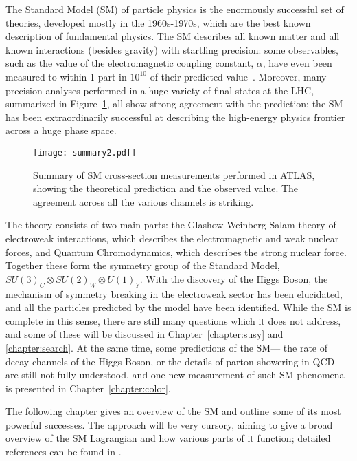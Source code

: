 \label{chapter:sm}

The Standard Model (SM) of particle physics is the enormously successful set of theories, developed mostly in the 1960s-1970s, which are the best known description of fundamental physics. The SM describes all known matter and all known interactions (besides gravity) with startling precision: some observables, such as the value of the electromagnetic coupling constant, $\alpha$, have even been measured to within 1 part in $10^{10}$ of their predicted value~\cite{PhysRevLett.100.120801}. Moreover, many precision analyses performed in a huge variety of final states at the LHC, summarized in Figure~\ref{fig:sm:summary}, all show strong agreement with the prediction: the SM has been extraordinarily successful at describing the high-energy physics frontier across a huge phase space.


\begin{figure}
\centering
\texttt{[image: summary2.pdf]}
\caption{Summary of SM cross-section measurements performed in ATLAS, showing the theoretical prediction and the observed value. The agreement across all the various channels is striking.}
\label{fig:sm:summary}
\end{figure}



The theory consists of two main parts: the Glashow-Weinberg-Salam theory of electroweak interactions, which describes the electromagnetic and weak nuclear forces, and Quantum Chromodynamics, which describes the strong nuclear force. Together these form the symmetry group of the Standard Model, $SU(3)_C \otimes SU(2)_W \otimes U(1)_Y$. With the discovery of the Higgs Boson, the mechanism of symmetry breaking in the electroweak sector has been elucidated, and all the particles predicted by the model have been identified. While the SM is complete in this sense, there are still many questions which it does not address, and some of these will be discussed in Chapter~\ref{chapter:susy} and \ref{chapter:search}. At the same time, some predictions of the SM--- the rate of decay channels of the Higgs Boson, or the details of parton showering in QCD--- are still not fully understood, and one new measurement of such SM phenomena is presented in Chapter~\ref{chapter:color}.

The following chapter gives an overview of the SM and outline some of its most powerful successes. The approach will be very cursory, aiming to give a broad overview of the SM Lagrangian and how various parts of it function; detailed references can be found in \cite{schwartz,2006physics11219P}. 



